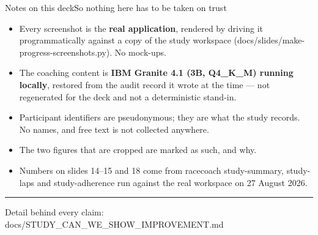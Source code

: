 \documentclass[aspectratio=169,10pt]{beamer}
\newcommand{\kw}[1]{\textcolor{cblue}{\textbf{#1}}}
\newcommand{\code}[1]{{\ttfamily\small #1}}
\begin{document}
\begin{frame}{Notes on this deck}{So nothing here has to be taken on trust}
  \begin{itemize}\footnotesize
    \item Every screenshot is the \kw{real application}, rendered by driving it
      programmatically against a copy of the study workspace
      (\code{docs/slides/make-progress-screenshots.py}). No mock-ups.
    \item The coaching content is \kw{IBM Granite 4.1 (3B, Q4\_K\_M) running locally},
      restored from the audit record it wrote at the time --- not regenerated for
      the deck and not a deterministic stand-in.
    \item Participant identifiers are pseudonymous; they are what the study records.
      No names, and free text is not collected anywhere.
    \item The two figures that are cropped are marked as such, and why.
    \item Numbers on slides 14--15 and 18 come from
      \code{racecoach study-summary}, \code{study-laps} and \code{study-adherence}
      run against the real workspace on 27 August 2026.
  \end{itemize}
  \vspace{0.8em}
  \begin{center}
  {\color{cblue}\rule{0.4\textwidth}{1.1pt}}\par\vspace{0.6em}
  {\footnotesize\color{cgray}Detail behind every claim:
  \code{docs/STUDY\_CAN\_WE\_SHOW\_IMPROVEMENT.md}}
  \end{center}
\end{frame}
\end{document}
